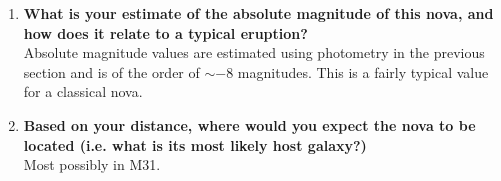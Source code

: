 \documentclass{article}
\begin{document}
\begin{enumerate}
		\item \textbf{What is your estimate of the absolute magnitude of this nova, and how does it relate to a typical eruption?} \\
		Absolute magnitude values are estimated using photometry in the previous section and is of the order of \(\sim -8\) magnitudes. This is a fairly typical value for a classical nova.

		\item \textbf{Based on your distance, where would you expect the nova to be located (i.e. what is its most likely host galaxy?)}\\
		Most possibly in M31.

	\end{enumerate}
\end{document}
